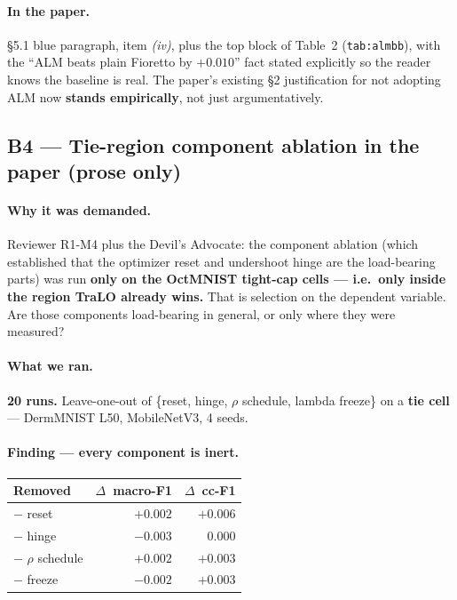 \documentclass[11pt,a4paper]{article}
\newcommand{\D}{$\Delta$}
\begin{document}
\paragraph{In the paper.} \S5.1 blue paragraph, item \emph{(iv)}, plus the top block of Table~2
(\texttt{tab:almbb}), with the ``ALM beats plain Fioretto by $+0.010$'' fact stated explicitly so
the reader knows the baseline is real. The paper's existing \S2 justification for not adopting ALM
now \textbf{stands empirically}, not just argumentatively.

\subsection*{B4 --- Tie-region component ablation
\hfill\normalsize\textcolor{okgreen}{\textbf{in the paper (prose only)}}}

\paragraph{Why it was demanded.} Reviewer R1-M4 plus the Devil's Advocate: the component ablation
(which established that the optimizer reset and undershoot hinge are the load-bearing parts) was run
\textbf{only on the OctMNIST tight-cap cells --- i.e.\ only inside the region TraLO already wins.}
That is selection on the dependent variable. Are those components load-bearing in general, or only
where they were measured?

\paragraph{What we ran.} \textbf{20 runs.} Leave-one-out of \{reset, hinge, $\rho$ schedule, lambda
freeze\} on a \textbf{tie cell} --- DermMNIST L50, MobileNetV3, 4 seeds.

\paragraph{Finding --- every component is inert.}

\begin{center}
\begin{tabular}{@{}l r r@{}}
\toprule
\textbf{Removed} & \textbf{\D\ macro-F1} & \textbf{\D\ cc-F1} \\
\midrule
$-$ reset            & $+0.002$ & $+0.006$ \\
$-$ hinge            & $-0.003$ & $0.000$  \\
$-$ $\rho$ schedule  & $+0.002$ & $+0.003$ \\
$-$ freeze           & $-0.002$ & $+0.003$ \\
\bottomrule
\end{tabular}
\end{center}
\end{document}
